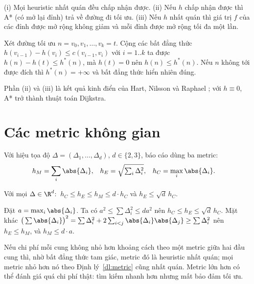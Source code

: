 \begin{dinhly}
  \label{dl:toi-uu}
  (i) Mọi heuristic nhất quán đều chấp nhận được. (ii) Nếu $h$ chấp nhận được thì A* (có mở
  lại đỉnh) trả về đường đi tối ưu. (iii) Nếu $h$ nhất quán thì giá trị $f$ của các đỉnh được
  mở rộng không giảm và mỗi đỉnh được mở rộng tối đa một lần.
\end{dinhly}

\begin{loigiai}
  Xét đường tối ưu $n = v_0, v_1, \dots, v_k = t$. Cộng các bất đẳng thức
  $h(v_{i-1}) - h(v_i) \le c(v_{i-1}, v_i)$ với $i = 1..k$ ta được
  $h(n) - h(t) \le h^\ast(n)$, mà $h(t) = 0$ nên $h(n) \le h^\ast(n)$. Nếu $n$ không tới được
  đích thì $h^\ast(n) = +\infty$ và bất đẳng thức hiển nhiên đúng.
\end{loigiai}

Phần (ii) và (iii) là kết quả kinh điển của Hart, Nilsson và Raphael \cite{hart1968}; với
$h \equiv 0$, A* trở thành thuật toán Dijkstra.

\section{Các metric không gian}
\label{sec:metric}

Với hiệu tọa độ $\Delta = (\Delta_1, \dots, \Delta_d)$, $d \in \{2, 3\}$, báo cáo dùng ba
metric:
\begin{align}
  h_{M} &= \sum_{i} \abs{\Delta_i}, &
  h_{E} &= \sqrt{\textstyle\sum_{i} \Delta_i^2}, &
  h_{C} &= \max_{i} \abs{\Delta_i}.
  \label{eq:metric}
\end{align}

\begin{dinhly}
  \label{dl:metric}
  Với mọi $\Delta \in \R^d$: $\ h_C \le h_E \le h_M \le d \cdot h_C$ và $h_E \le \sqrt{d}\, h_C$.
\end{dinhly}

\begin{loigiai}
  Đặt $a = \max_i \abs{\Delta_i}$. Ta có $a^2 \le \sum \Delta_i^2 \le d a^2$ nên
  $h_C \le h_E \le \sqrt{d}\, h_C$. Mặt khác
  $\big(\sum \abs{\Delta_i}\big)^2 = \sum \Delta_i^2 + 2\sum_{i<j}\abs{\Delta_i}\abs{\Delta_j}
  \ge \sum \Delta_i^2$ nên $h_E \le h_M$, và $h_M \le d \cdot a$.
\end{loigiai}

\begin{ghichu}
  Nếu chi phí mỗi cung không nhỏ hơn khoảng cách theo một metric giữa hai đầu cung thì, nhờ bất
  đẳng thức tam giác, metric đó là heuristic nhất quán; mọi metric nhỏ hơn nó theo
  Định lý~\ref{dl:metric} cũng nhất quán. Metric lớn hơn có thể đánh giá quá chi phí
  thật: tìm kiếm nhanh hơn nhưng mất bảo đảm tối ưu.
\end{ghichu}

